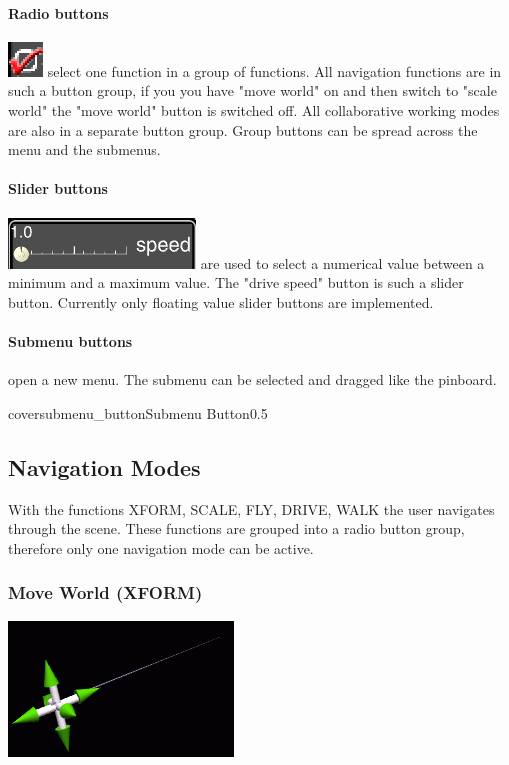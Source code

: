 \paragraph{Radio buttons} 
\latexonly
\includegraphics[scale=0.5]{cover/pict/radio_button_icon} 
\endlatexonly
{}
select one function in a group of functions.
All navigation functions are in such a button group, if you you have 
"move world" on and then switch to "scale world" the "move world" button 
is switched off. 
All collaborative working modes are also in a separate button group.
Group buttons can be spread across the menu and the submenus.

\paragraph{Slider buttons} 
\latexonly
\includegraphics[scale=0.5]{cover/pict/slider_button} 
\endlatexonly
{}
are used to select a numerical value between a minimum
and a maximum value. The "drive speed" button is such a slider button.
Currently only floating value slider buttons are implemented.

\paragraph{Submenu buttons} open a new menu. The submenu can be selected
and dragged like the pinboard.

\begin{covimg}{cover}{submenu_button}{Submenu Button}{0.5}\end{covimg}


	
\subsection{Navigation Modes}
With the functions XFORM, SCALE, FLY, DRIVE, WALK
the user navigates through the scene. These functions are grouped into
a radio button group, therefore only one navigation mode can be active.

\subsubsection{Move World (XFORM)}
\latexonly
\includegraphics[scale=0.5]{cover/pict/xform} 
\endlatexonly
{}

